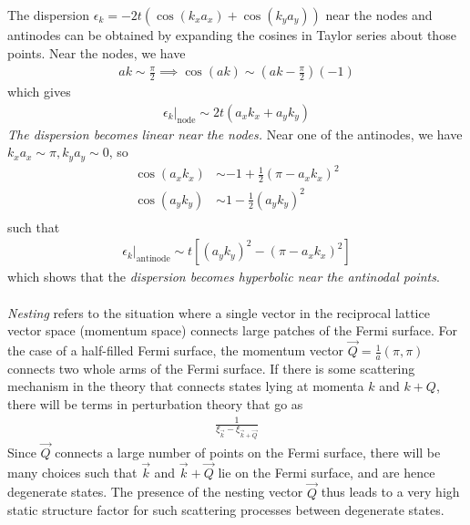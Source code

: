 \documentclass[12pt,onecolumn]{revtex4-2}
\begin{document}
The dispersion \(\epsilon_k = -2t\left(\cos(k_x a_x) + \cos(k_y a_y)\right)\) near the nodes and antinodes can be obtained by expanding the cosines in Taylor series about those points. Near the nodes, we have
\begin{equation}\begin{aligned}
	ak \sim \frac{\pi}{2} \implies \cos(ak) \sim \left(ak - \frac{\pi}{2}\right)(-1)
\end{aligned}\end{equation}
which gives
\begin{equation}\begin{aligned}
	\epsilon_k \vert_\text{node} \sim 2t \left(a_x k_x + a_y k_y\right)
\end{aligned}\end{equation}
\textit{The dispersion becomes linear near the nodes.} Near one of the antinodes, we have \(k_x a_x \sim \pi, k_y a_y \sim 0\), so
\begin{equation}\begin{aligned}
	\cos (a_x k_x) &\sim -1 + \frac{1}{2}\left( \pi - a_x k_x \right)^2\\
	\cos (a_y k_y) &\sim 1 - \frac{1}{2}\left(a_y k_y \right)^2\\
\end{aligned}\end{equation}
such that
\begin{equation}\begin{aligned}
	\epsilon_k \vert_\text{antinode} \sim t \left[\left(a_y k_y \right)^2 - \left( \pi - a_x k_x \right)^2\right]
\end{aligned}\end{equation}
which shows that the \textit{dispersion becomes hyperbolic near the antinodal points}.
\\\\
\textit{Nesting} refers to the situation where a single vector in the reciprocal lattice vector space (momentum space) connects large patches of the Fermi surface. For the case of a half-filled Fermi surface, the momentum vector \(\vec Q = \frac{1}{a}\left( \pi, \pi\right)\) connects two whole arms of the Fermi surface. If there is some scattering mechanism in the theory that connects states lying at momenta \(k\) and \(k+Q\), there will be terms in perturbation theory that go as
\begin{equation}\begin{aligned}
	\frac{1}{\xi_{\vec k} - \xi_{\vec k + \vec Q}}
\end{aligned}\end{equation}
Since \(\vec Q\) connects a large number of points on the Fermi surface, there will be many choices such that \(\vec k\) and \(\vec k + \vec Q\) lie on the Fermi surface, and are hence degenerate states. The presence of the nesting vector \(\vec Q\) thus leads to a very high static structure factor for such scattering processes between degenerate states.
\end{document}

